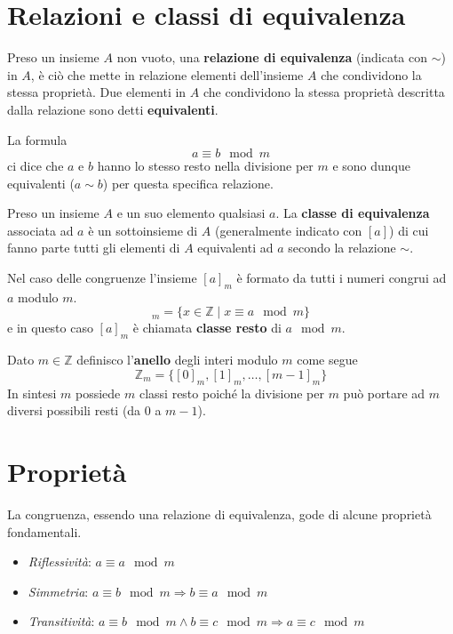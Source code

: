 \section{Relazioni e classi di equivalenza}

\begin{defn}
	Preso un insieme $A$ non vuoto, una \textbf{relazione di equivalenza} (indicata con $\sim$) in $A$,
	\`e ci\`o che mette in relazione elementi dell'insieme $A$ che condividono la stessa propriet\`a.
	Due elementi in $A$ che condividono la stessa propriet\`a descritta dalla relazione sono detti
	\textbf{equivalenti}.
\end{defn}

La formula
\begin{equation*}
	a \equiv b \mod{m}
\end{equation*}
ci dice che $a$ e $b$ hanno lo stesso resto nella divisione per $m$ e sono dunque
equivalenti ($a \sim b$) per questa specifica relazione.

\begin{defn}
	Preso un insieme $A$ e un suo elemento qualsiasi $a$. La \textbf{classe di equivalenza} associata
	ad $a$ \`e un sottoinsieme di $A$ (generalmente indicato con $[a]$) di cui fanno parte tutti gli
	elementi di $A$ equivalenti ad $a$ secondo la relazione $\sim$.
\end{defn}

Nel caso delle congruenze l'insieme $[a]_m$ \`e formato da tutti i numeri congrui ad $a$ modulo $m$.
\begin{equation*}
	[a]_m = \{ x \in \mathbb{Z} \mid x \equiv a \mod{m} \}
\end{equation*}
e in questo caso $[a]_m$ \`e chiamata \textbf{classe resto} di $a \mod{m}$.

\begin{defn}
	Dato $m \in \mathbb{Z}$ definisco l'\textbf{anello} degli interi modulo $m$ come segue
	\begin{equation*}
		\mathbb{Z}_m = \{ [0]_m, [1]_m, \dots, [m - 1]_m \}
	\end{equation*}
	In sintesi $m$ possiede $m$ classi resto poich\'e la divisione per $m$ pu\`o portare ad $m$ diversi
	possibili resti (da 0 a $m - 1$).
\end{defn}

\section{Propriet\`a}
La congruenza, essendo una relazione di equivalenza, gode di alcune propriet\`a fondamentali.
\begin{itemize}
	\item \emph{Riflessivit\`a}: $a \equiv a \mod{m}$
	\item \emph{Simmetria}: $a \equiv b \mod{m} \Rightarrow b \equiv a \mod{m}$
	\item \emph{Transitivit\`a}: $a \equiv b \mod{m} \wedge b \equiv c \mod{m} \Rightarrow
		      a \equiv c \mod{m}$
\end{itemize}

